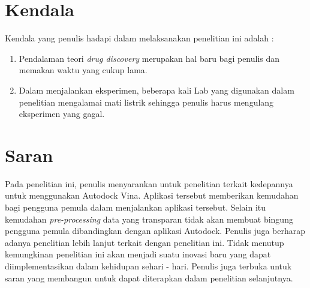  \section{Kendala}
 Kendala yang penulis hadapi dalam melaksanakan penelitian ini adalah :
 \begin{enumerate}
 	\item Pendalaman teori \textit{drug discovery} merupakan hal baru bagi penulis dan memakan waktu yang cukup lama.
 	\item Dalam menjalankan eksperimen, beberapa kali Lab yang digunakan dalam penelitian mengalamai mati listrik sehingga penulis harus mengulang eksperimen yang gagal. 
 \end{enumerate} 

\section{Saran}
\hspace{0.5cm}Pada penelitian ini, penulis menyarankan untuk penelitian terkait kedepannya untuk menggunakan Autodock Vina. Aplikasi tersebut memberikan kemudahan bagi pengguna pemula dalam menjalankan aplikasi tersebut. Selain itu kemudahan \textit{pre-processing} data yang transparan tidak akan membuat bingung pengguna pemula dibandingkan dengan aplikasi Autodock. Penulis juga berharap adanya penelitian lebih lanjut terkait dengan penelitian ini. Tidak menutup kemungkinan penelitian ini akan menjadi suatu inovasi baru yang dapat diimplementasikan dalam kehidupan sehari - hari. Penulis juga terbuka untuk saran yang membangun untuk dapat diterapkan dalam penelitian selanjutnya.


